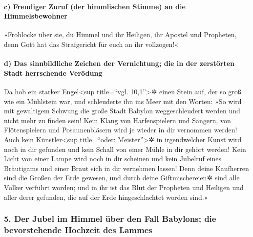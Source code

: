 \hypertarget{c-freudiger-zuruf-der-himmlischen-stimme-an-die-himmelsbewohner}{%
\paragraph{c) Freudiger Zuruf (der himmlischen Stimme) an die
Himmelsbewohner}\label{c-freudiger-zuruf-der-himmlischen-stimme-an-die-himmelsbewohner}}

 »Frohlocke über sie, du Himmel und ihr Heiligen, ihr
Apostel und Propheten, denn Gott hat das Strafgericht für euch an ihr
vollzogen!«

\hypertarget{d-das-sinnbildliche-zeichen-der-vernichtung-die-in-der-zerstuxf6rten-stadt-herrschende-veruxf6dung}{%
\paragraph{d) Das sinnbildliche Zeichen der Vernichtung; die in der
zerstörten Stadt herrschende
Verödung}\label{d-das-sinnbildliche-zeichen-der-vernichtung-die-in-der-zerstuxf6rten-stadt-herrschende-veruxf6dung}}

 Da hob ein starker Engel\textless sup title=``vgl.
10,1''\textgreater✲ einen Stein auf, der so groß wie ein Mühlstein war,
und schleuderte ihn ins Meer mit den Worten: »So wird mit gewaltigem
Schwung die große Stadt Babylon weggeschleudert werden und nicht mehr zu
finden sein!  Kein Klang von Harfenspielern und Sängern,
von Flötenspielern und Posaunenbläsern wird je wieder in dir vernommen
werden! Auch kein Künstler\textless sup title=``oder:
Meister''\textgreater✲ in irgendwelcher Kunst wird noch in dir gefunden
und kein Schall von einer Mühle in dir gehört werden! 
Kein Licht von einer Lampe wird noch in dir scheinen und kein Jubelruf
eines Bräutigams und einer Braut sich in dir vernehmen lassen! Denn
deine Kaufherren sind die Großen der Erde gewesen, und durch deine
Giftmischereien✲ sind alle Völker verführt worden;  und
in ihr ist das Blut der Propheten und Heiligen und aller derer gefunden,
die auf der Erde hingeschlachtet worden sind.«

\hypertarget{der-jubel-im-himmel-uxfcber-den-fall-babylons-die-bevorstehende-hochzeit-des-lammes}{%
\subsubsection{5. Der Jubel im Himmel über den Fall Babylons; die
bevorstehende Hochzeit des
Lammes}\label{der-jubel-im-himmel-uxfcber-den-fall-babylons-die-bevorstehende-hochzeit-des-lammes}}

